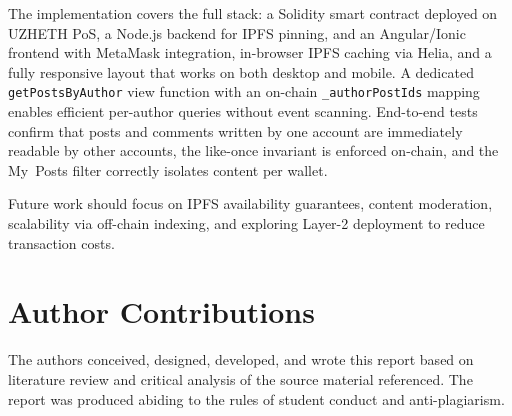 \documentclass[11pt]{article}
\begin{document}
The implementation covers the full stack: a Solidity smart contract deployed on UZHETH PoS, a Node.js backend for IPFS pinning, and an Angular/Ionic frontend with MetaMask integration, in-browser IPFS caching via Helia, and a fully responsive layout that works on both desktop and mobile. A dedicated \texttt{getPostsByAuthor} view function with an on-chain \texttt{\_authorPostIds} mapping enables efficient per-author queries without event scanning. End-to-end tests confirm that posts and comments written by one account are immediately readable by other accounts, the like-once invariant is enforced on-chain, and the My~Posts filter correctly isolates content per wallet.

Future work should focus on IPFS availability guarantees, content moderation, scalability via off-chain indexing, and exploring Layer-2 deployment to reduce transaction costs.

\section*{Author Contributions}

The authors conceived, designed, developed, and wrote this report based on literature review and critical analysis of the source material referenced. The report was produced abiding to the rules of student conduct and anti-plagiarism.



\end{document}
